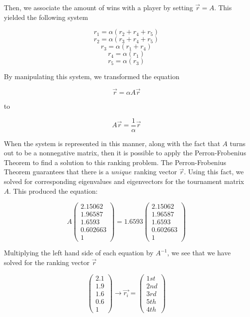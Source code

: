 \documentclass[12pt]{scrreprt}
\begin{document}
Then, we associate the amount of wins with a player by setting $\vec{r} = A$. This yielded the
following system

\[ r_1 = \alpha(r_2 + r_4 + r_5) \]
\[ r_2 = \alpha(r_3 + r_4 + r_5)\]
\[ r_3 = \alpha(r_1 + r_4)\]
\[ r_4 = \alpha(r_1)\]
\[ r_5 = \alpha(r_3)\]

By manipulating this system, we transformed the equation

\[\vec{r} = \alpha A \vec{r}\]

to

 \[A\vec{r} = \frac{1}{\alpha}\vec{r} \]

 When the system is represented in this manner, along with the fact that $A$ turns
 out to be a nonnegative matrix, then it is possible to apply the Perron-Frobenius Theorem
 to find a solution to this ranking problem. The Perron-Frobenius Theorem guarantees that there is a $unique$
 ranking vector $\vec{r}$. Using this fact, we solved for corresponding eigenvalues and eigenvectors for the tournament
 matrix $A$. This produced the equation: 
 
 \[A\begin{pmatrix}2.15062\\1.96587\\1.6593\\0.602663\\1\end{pmatrix} = 1.6593\begin{pmatrix}2.15062\\1.96587\\1.6593\\0.602663\\1\end{pmatrix} \]

Multiplying the left hand side of each equation by $A^{-1}$, we see that we have solved
for the ranking vector $\vec{r}$

\[\begin{pmatrix}2.1\\1.9\\1.6\\0.6\\1\end{pmatrix} \rightarrow \vec{r_i} = \begin{pmatrix}1st\\2nd\\3rd\\5th\\4th\end{pmatrix} \]
\end{document}
